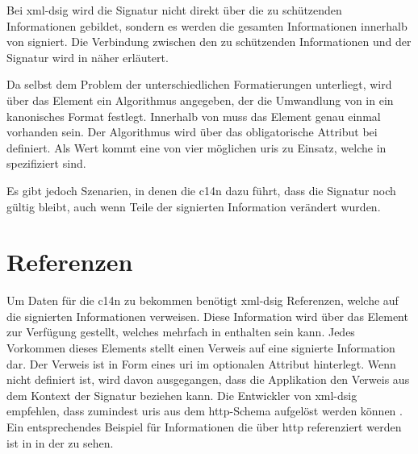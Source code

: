 Bei \gls{xml-dsig} wird die Signatur nicht direkt über die zu schützenden Informationen gebildet, sondern es werden die gesamten Informationen innerhalb von
 signiert. Die Verbindung zwischen den zu schützenden Informationen und der Signatur wird in  näher erläutert.

Da  selbst dem Problem der unterschiedlichen Formatierungen unterliegt, wird über das Element  ein
Algorithmus angegeben, der die Umwandlung von  in ein kanonisches Format festlegt. Innerhalb von  muss das Element
 genau einmal vorhanden sein. Der Algorithmus wird über das obligatorische Attribut 
bei  definiert. Als Wert kommt eine von vier möglichen \glspl{uri} zu Einsatz, welche in \cite{xml-dsig:w3c} spezifiziert sind.

Es gibt jedoch Szenarien, in denen die \gls{c14n} dazu führt, dass die Signatur noch gültig bleibt, auch wenn Teile der signierten Information verändert wurden.
\todo

\section{Referenzen}
\label{sec:XML-DSig:Referenzen}
Um Daten für die \gls{c14n} zu bekommen benötigt \gls{xml-dsig} Referenzen, welche auf die signierten Informationen verweisen. Diese Information wird über das 
Element  zur Verfügung gestellt, welches mehrfach in  enthalten sein kann. Jedes Vorkommen dieses Elements stellt einen
Verweis auf eine signierte Information dar. Der Verweis ist in Form eines \gls{uri} im optionalen Attribut  hinterlegt. Wenn
 nicht definiert ist, wird davon ausgegangen, dass die Applikation den Verweis aus dem Kontext der Signatur beziehen kann. Die
Entwickler von \gls{xml-dsig} empfehlen, dass zumindest \glspl{uri} aus dem \gls{http}-Schema aufgelöst werden können \cite{xml-dsig:w3c}. Ein entsprechendes
Beispiel für Informationen die über \gls{http} referenziert werden ist in  in der
 zu sehen.



